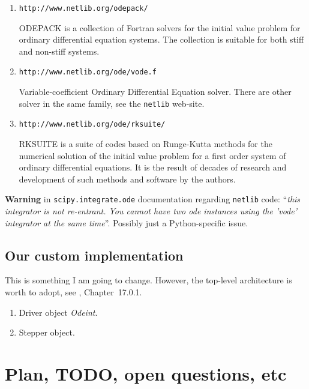\documentclass[]{article}
\begin{document}
\begin{enumerate}
\item \verb|http://www.netlib.org/odepack/|

ODEPACK is a collection of Fortran solvers for the initial value problem for ordinary differential equation systems. The collection is suitable for both stiff and non-stiff systems.

\item \verb|http://www.netlib.org/ode/vode.f|

Variable-coefficient Ordinary Differential Equation solver. There are other solver in the same family, see the {\tt netlib} web-site.

\item \verb|http://www.netlib.org/ode/rksuite/|

RKSUITE is a suite of codes based on Runge-Kutta methods for the numerical solution of the initial value problem for a first order system of ordinary differential equations.  It is the result of decades of research and development of such methods and software by the authors.
\end{enumerate}

\textbf{Warning} in \verb|scipy.integrate.ode| documentation regarding {\tt netlib} code: ``\textit{this integrator is not re-entrant. You cannot have two ode instances using the 'vode' integrator at the same time}''. Possibly just a Python-specific issue.

\subsection{Our custom implementation}

This is something I am going to change. However, the top-level architecture is worth to adopt, see \cite{NR07}, Chapter~17.0.1.
\begin{enumerate}
\item Driver object \textit{Odeint}.
\item Stepper object.
\end{enumerate}

\section{Plan, TODO, open questions, etc}
\end{document}

